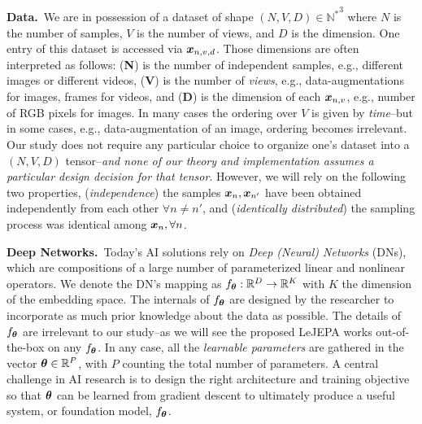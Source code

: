 {\bf Data.}~We are in possession of a dataset of shape $(N, V, D) \in {\mathbb{N}^*}^3$ where $N$ is the number of samples, $V$ is the number of views, and $D$ is the dimension. One entry of this dataset is accessed via ${\bm{x}}_{n,v,d}$. Those dimensions are often interpreted as follows: ({\bf N}) is the number of independent samples, e.g., different images or different videos, ({\bf V}) is the number of {\em views}, e.g., data-augmentations for images, frames for videos, and ({\bf D}) is the dimension of each ${\bm{x}}_{n,v}$, e.g., number of RGB pixels for images. In many cases the ordering over $V$ is given by {\em time}--but in some cases, e.g., data-augmentation of an image, ordering becomes irrelevant. Our study does not require any particular choice to organize one's dataset into a $(N,V,D)$ tensor--{\em and none of our theory and implementation assumes a particular design decision for that tensor}. However, we will rely on the following two properties, ({\em independence}) the samples ${\bm{x}}_{n},{\bm{x}}_{n'}$ have been obtained independently from each other $\forall n\not = n'$, and ({\em identically distributed}) the sampling process was identical among ${\bm{x}}_{n}, \forall n$.

{\bf Deep Networks.}~Today's AI solutions rely on {\em Deep (Neural) Networks} (DNs), which are compositions of a large number of parameterized linear and nonlinear operators.
We denote the DN's mapping as $f_{\bm{\theta}}: \mathbb{R}^D \rightarrow \mathbb{R}^K$ with $K$ the dimension of the embedding space. The internals of $f_{\bm{\theta}}$ are designed by the researcher to incorporate as much prior knowledge about the data as possible. The details of $f_{\bm{\theta}}$ are irrelevant to our study--as we will see the proposed LeJEPA works out-of-the-box on any $f_{\bm{\theta}}$. In any case, all the {\em learnable parameters} are gathered in the vector  ${\bm{\theta}} \in \mathbb{R}^P$, with $P$ counting the total number of parameters. A central challenge in AI research is to design the right architecture and training objective so that ${\bm{\theta}}$ can be learned from gradient descent to ultimately produce a useful system, or foundation model, $f_{{\bm{\theta}}}$. 



